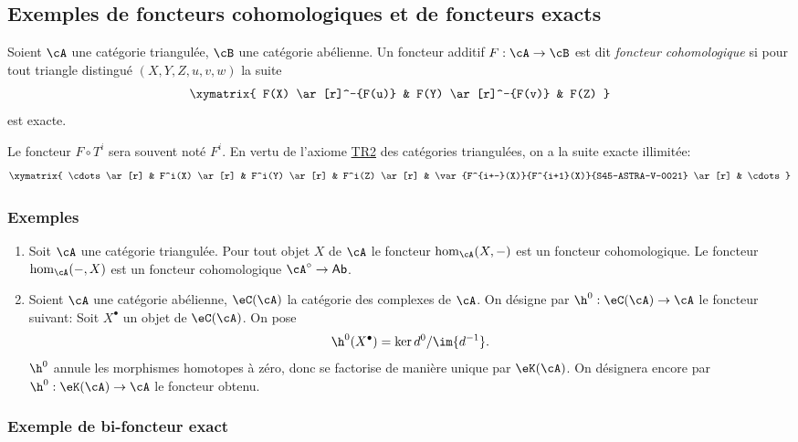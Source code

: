 \subsection{Exemples de foncteurs cohomologiques et de foncteurs exacts}\label{VIII:1-3}





\begin{definition}
Soient $\cA$ une catégorie triangulée, $\cB$ une catégorie abélienne. 
Un foncteur additif $F:\cA\to \cB$ est dit \emph{foncteur cohomologique} si 
pour tout triangle distingué $(X,Y,Z,u,v,w)$ la suite 
\[\xymatrix{
  F(X) \ar[r]^-{F(u)} 
    & F(Y) \ar[r]^-{F(v)} 
    & F(Z) 
}\]
est exacte. 
\end{definition}

Le foncteur $F\circ T^i$ sera souvent noté $F^i$. En vertu de l'axiome 
\hyperlink{VIII:TR2}{TR2} des catégories triangulées, on a la suite 
exacte illimitée: 
\[\xymatrix{
  \cdots \ar[r] 
    & F^i(X) \ar[r] 
    & F^i(Y) \ar[r] 
    & F^i(Z) \ar[r] 
    & \var{F^{i+-}(X)}{F^{i+1}(X)}{S45-ASTRA-V-0021} \ar[r] 
    & \cdots 
}\]





\subsubsection{Exemples}\label{VIII:1-3-2}

\begin{enumerate}
  \item Soit $\cA$ une catégorie triangulée. Pour tout objet $X$ de $\cA$ 
    le foncteur $\hom_\cA(X,-)$ est un foncteur cohomologique. Le foncteur 
    $\hom_\cA(-,X)$ est un foncteur cohomologique $\cA^\circ\to\mathsf{Ab}$. 
  \item Soient $\cA$ une catégorie abélienne, $\eC(\cA)$ la catégorie des 
    complexes de $\cA$. On désigne par $\h^0:\eC(\cA)\to\cA$ le foncteur 
    suivant: Soit $X^\bullet$ un objet de $\eC(\cA)$. On pose 
    \[
      \h^0(X^\bullet) = \ker d^0 / \im{d^{-1}} \text{.}
    \]
    $\h^0$ annule les morphismes homotopes à zéro, donc se factorise de 
    manière unique par $\eK(\cA)$. On désignera encore par 
    $\h^0:\eK(\cA) \to \cA$ le foncteur obtenu. 
\end{enumerate}





\subsubsection{Exemple de bi-foncteur exact}\label{VIII:1-3-3}

